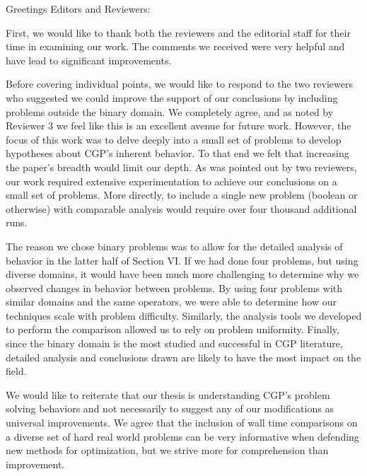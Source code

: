 \documentclass{letter}
\begin{document}
\begin{letter}{}
\opening{Greetings Editors and Reviewers:}

First, we would like to thank both the reviewers and the editorial staff for their
time in examining our work.  The comments we received were very helpful and
have lead to significant improvements.

Before covering individual points, we would like to respond to the two
reviewers who suggested we could improve the support of our conclusions by
including problems outside the binary domain.  We completely agree, and as
noted by Reviewer 3 we feel like this is an excellent avenue for future work.  However,
the focus of this work was to delve deeply into a small set of problems to
develop hypotheses about CGP's inherent behavior.  To that
end we felt that increasing the paper's breadth would limit our depth.  As was
pointed out by two reviewers, our work required extensive experimentation
to achieve our conclusions on a small set of problems.  More directly, to
include a single new problem (boolean or otherwise) with
comparable analysis would require over four thousand additional runs.

The reason we chose binary problems was to allow for the
detailed analysis of behavior in the latter half of Section VI.  If we had done
four problems, but using diverse domains, it would have been much more challenging
to determine why we observed changes in behavior between problems.  By using
four problems with similar domains and the same operators, we were able to determine
how our techniques scale with problem difficulty.  Similarly, the analysis tools
we developed to perform the comparison allowed us to rely on problem uniformity.
Finally, since the binary domain is
the most studied and successful in CGP literature, detailed analysis and conclusions drawn
are likely to have the most impact on the field.

We would like to reiterate that our thesis is understanding
CGP's problem solving behaviors and not necessarily to suggest any of our modifications
as universal improvements.  We agree that the inclusion of wall time comparisons on a diverse
set of hard real world problems can be very informative when defending new methods
for optimization, but we strive more for comprehension than improvement.


\end{letter}
\end{document}
